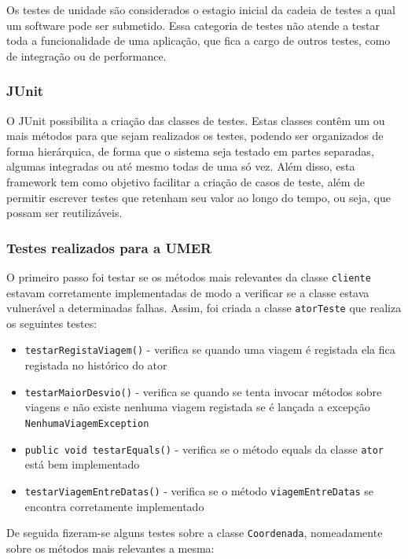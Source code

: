 Os testes de unidade são considerados o estagio inicial da cadeia de testes a qual um software pode ser submetido. Essa categoria de testes não atende a testar toda a funcionalidade de uma aplicação, que fica a cargo de outros testes, como de integração ou de performance.

\subsubsection*{JUnit} 
O JUnit possibilita a criação das classes de testes. Estas classes contêm um ou mais métodos para que sejam realizados os testes, podendo ser organizados de forma hierárquica, de forma que o sistema seja testado em partes separadas, algumas integradas ou até mesmo todas de uma só vez. Além disso, esta framework tem como objetivo facilitar a criação de casos de teste, além de permitir escrever testes que retenham seu valor ao longo do tempo, ou seja, que possam ser reutilizáveis.

\subsubsection*{Testes realizados para a UMER} 
O primeiro passo foi testar se os métodos mais relevantes da classe \texttt{cliente} estavam corretamente implementadas de modo a verificar se a classe estava vulnerável a determinadas falhas. Assim, foi criada a classe \texttt{atorTeste} que realiza os seguintes testes:

\begin{itemize}
    \item \texttt{testarRegistaViagem()} - verifica se quando uma viagem é registada ela fica registada no histórico do ator
    
    \item \texttt{testarMaiorDesvio()} - verifica se quando se tenta invocar métodos sobre viagens e não existe nenhuma viagem registada se é lançada a excepção \texttt{NenhumaViagemException}
    
    \item \texttt{public void testarEquals()} - verifica se o método equals da classe \texttt{ator} está bem implementado
    
    \item \texttt{testarViagemEntreDatas()} - verifica se o método \texttt{viagemEntreDatas} se encontra corretamente implementado
\end{itemize}

De seguida fizeram-se alguns testes sobre a classe \texttt{Coordenada}, nomeadamente sobre os métodos mais relevantes a mesma:

